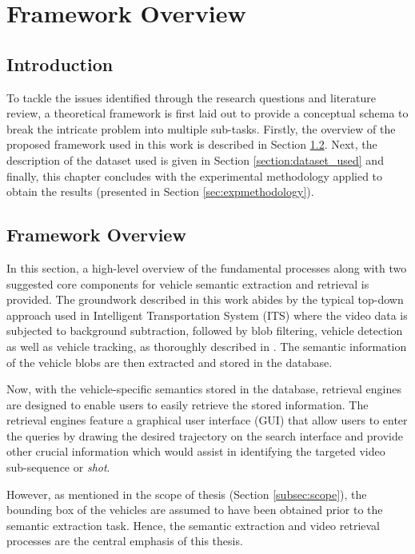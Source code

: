 \chapter{Framework Overview}
\label{chapter:framework}
\section{Introduction}
To tackle the issues identified through the research questions and literature review, a theoretical framework is first laid out to provide a conceptual schema to break the intricate problem into multiple sub-tasks. Firstly, the overview of the proposed framework used in this work is described in Section \ref{section:framework}. Next, the description of the dataset used is given in Section \ref{section:dataset_used} and finally, this chapter concludes with the experimental methodology applied to obtain the results (presented in Section \ref{sec:expmethodology}).


\section{Framework Overview}
\label{section:framework}
In this section, a high-level overview of the fundamental processes along with two suggested core components for vehicle semantic extraction and retrieval is provided.
The groundwork described in this work abides by the typical top-down approach used in Intelligent Transportation System (ITS) where the video data is subjected to background subtraction, followed by blob filtering, vehicle detection as well as vehicle tracking, as thoroughly described in \cite{lim2017}.
The semantic information of the vehicle blobs are then extracted and stored in the database.

Now, with the vehicle-specific semantics stored in the database, retrieval engines are designed to enable users to easily retrieve the stored information. The retrieval engines feature a graphical user interface (GUI) that allow users to enter the queries by drawing the desired trajectory on the search interface and provide other crucial information which would assist in identifying the targeted video sub-sequence or \emph{shot}.

However, as mentioned in the scope of thesis (Section \ref{subsec:scope}), the bounding box of the vehicles are assumed to have been obtained prior to the semantic extraction task. Hence, the semantic extraction and video retrieval processes are the central emphasis of this thesis.

